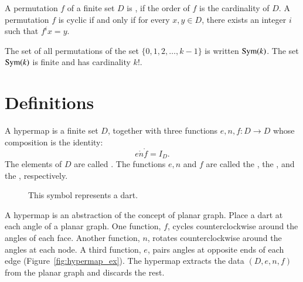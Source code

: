 A permutation $f$ of a finite set $D$ is , if the order of $f$ is the cardinality
of $D$.  A permutation $f$ is cyclic if and only if for every $x,y\in D$, there exists an integer $i$
such that $f^i x = y$.

The set of all permutations of the set $\{0,1,2,\ldots,k-1\}$ is written ${\operatorname{Sym}}(k)$.
The set ${\operatorname{Sym}}(k)$ is finite and has cardinality $k!$.



\section{Definitions}



\begin{definition}\label{def:hypermap}  
  A hypermap is a finite set $D$, together with three functions
  $e,n,f:D\to D$ whose composition is the identity:
  \begin{displaymath}
e\ocirc n\ocirc f = I_D.
\end{displaymath} The
elements of $D$ are called .  The functions $e,n$ and
$f$ are called the , the , and
the , respectively.  %
%
%
%
%
%
%
%
%
\end{definition}

\begin{figure}[htb]
\centering
{}
\caption{This symbol represents a dart.}
\label{fig:dart}
\end{figure}

\begin{remark} A hypermap is an abstraction of
the concept of 
planar graph.  Place a dart at each angle of a planar graph.
One function, $f$, 
cycles counterclockwise around the angles of each face.  
Another function, $n$, 
rotates counterclockwise around the angles at each
node.  A third function, $e$, pairs angles at opposite ends of
each edge  (Figure~\ref{fig:hypermap_ex}).   The hypermap extracts
the data $(D,e,n,f)$ from the planar graph and discards the rest.
%
\end{remark}

